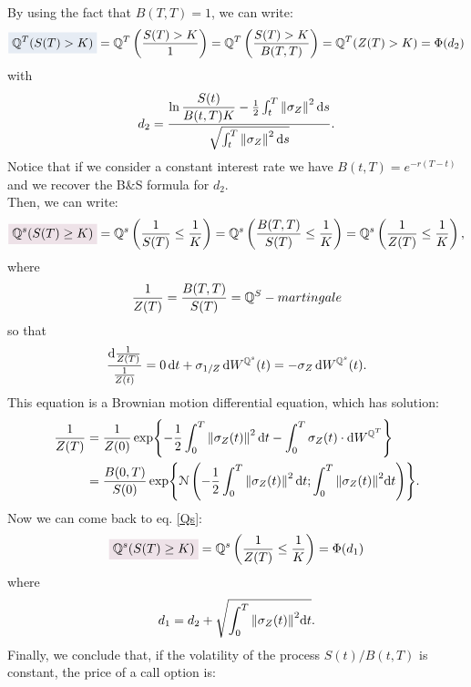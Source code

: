 By using the fact that $B(T,T)=1$, we can write:
\begin{equation*}
    \hlc{mylightblue}{\Qmeas^T(S(T)> K)} = \Qmeas^T\left(\dfrac{S(T)> K}{1}\right) = \Qmeas^T\left(\dfrac{S(T)> K}{B(T,T)}\right) = \Qmeas^T(Z(T)> K) = \Phi(d_2)
\end{equation*}
with
\begin{equation}
    d_2 = \dfrac{\ln\dfrac{S(t)}{B(t,T)K}-\frac{1}{2}\int_t^T\norm{\sigma_Z}^2\,\dd s}{\sqrt{\int_t^T\norm{\sigma_Z}^2\,\dd s}}.
\end{equation}
Notice that if we consider a constant interest rate we have $B(t,T)=e^{-r(T-t)}$ and we recover the B\&S formula for $d_2$.\\ %
Then, we can write:
\begin{equation}\label{Qs}
    \hlc{mypink}{\Qmeas^s(S(T)\ge K)} = \Qmeas^s\left(\frac{1}{S(T)}\le\frac{1}{K}\right) = \Qmeas^s\left(\frac{B(T,T)}{S(T)}\le\frac{1}{K}\right) = \Qmeas^s\left(\frac{1}{Z(T)}\le\frac{1}{K}\right),
\end{equation}
where
\begin{equation}
    \frac{1}{Z(T)} = \frac{B(T,T)}{S(T)} = \mathbb{Q}^S-martingale
\end{equation}
so that
\begin{equation}
    \dfrac{\dd \frac{1}{Z(T)}}{\frac{1}{Z(t)}} = 0\,\dd t + \sigma_{1/Z}\,\dd W^{\Qmeas^s}(t) = -\sigma_Z \,\dd W^{\Qmeas^s}(t). %
\end{equation}
This equation is a Brownian motion differential equation, which has solution:
\begin{align}
    \frac{1}{Z(T)} &= \frac{1}{Z(0)}\exp{{-\frac{1}{2}\int_0^T\norm{\sigma_Z(t)}^2\,\dd t - \int_0^T\sigma_Z(t)\cdot\dd W^{\mathbb{Q}^T}}} \\
    &=
    \dfrac{B(0,T)}{S(0)}\exp{{\mathcal{N}\left(-\frac{1}{2}\int_0^T\norm{\sigma_Z(t)}^2\,\dd t; \int_0^T\norm{\sigma_Z(t)}^2\dd t\right)}}.
\end{align}
Now we can come back to eq. \eqref{Qs}:
\begin{equation}
    \hlc{mypink}{\Qmeas^s(S(T)\ge K)} = \Qmeas^s\left(\frac{1}{Z(T)}\le\frac{1}{K}\right) = \Phi(d_1)
\end{equation}
where
\begin{equation}
    d_1 = d_2 + \sqrt{\int_0^T\norm{\sigma_Z(t)}^2\dd t}.
\end{equation}
Finally, we conclude that, if the volatility of the process $S(t)/B(t,T)$ is constant, the price of a call option is:
